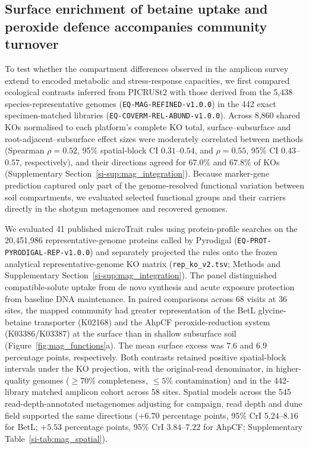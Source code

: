 \subsection*{Surface enrichment of betaine uptake and peroxide defence accompanies community turnover}

To test whether the compartment differences observed in the amplicon survey extend to encoded metabolic and stress-response capacities, we first compared ecological contrasts inferred from PICRUSt2 with those derived from the 5,438 species-representative genomes (\texttt{EQ-MAG-\allowbreak REFINED-\allowbreak v1.0.0}) in the 442 exact specimen-matched libraries (\texttt{EQ-COVERM-\allowbreak REL-\allowbreak ABUND-\allowbreak v1.0.0}). Across 8,860 shared KOs normalised to each platform's complete KO total, surface--subsurface and root-adjacent--subsurface effect sizes were moderately correlated between methods (Spearman $\rho=0.52$, 95\% spatial-block CI $0.31$--$0.54$, and $\rho=0.55$, 95\% CI $0.43$--$0.57$, respectively), and their directions agreed for $67.0\%$ and $67.8\%$ of KOs (Supplementary Section~\ref{si-sup:mag_integration}). Because marker-gene prediction captured only part of the genome-resolved functional variation between soil compartments, we evaluated selected functional groups and their carriers directly in the shotgun metagenomes and recovered genomes.

We evaluated 41 published microTrait rules \cite{karaoz2022microtrait} using protein-profile searches on the 20,451,986 representative-genome proteins called by Pyrodigal (\texttt{EQ-PROT-\allowbreak PYRODIGAL-\allowbreak REP-\allowbreak v1.0.0}) and separately projected the rules onto the frozen analytical representative-genome KO matrix (\texttt{rep\_ko\_v2.tsv}; Methods and Supplementary Section~\ref{si-sup:mag_integration}). The panel distinguished compatible-solute uptake from de novo synthesis and acute exposure protection from baseline DNA maintenance. In paired comparisons across 68 visits at 36 sites, the mapped community had greater representation of the BetL glycine-betaine transporter (K02168) and the AhpCF peroxide-reduction system (K03386/K03387) at the surface than in shallow subsurface soil (Figure~\ref{fig:mag_functions}a). The mean surface excess was $7.6$ and $6.9$ percentage points, respectively. Both contrasts retained positive spatial-block intervals under the KO projection, with the original-read denominator, in higher-quality genomes ($\ge 70\%$ completeness, $\le 5\%$ contamination) and in the 442-library matched amplicon cohort across 58 sites. Spatial models across the 545 read-depth-annotated metagenomes adjusting for campaign, read depth and dune field supported the same directions ($+6.70$ percentage points, 95\% CrI $5.24$--$8.16$ for BetL; $+5.53$ percentage points, 95\% CrI $3.84$--$7.22$ for AhpCF; Supplementary Table~\ref{si-tab:mag_spatial}).

